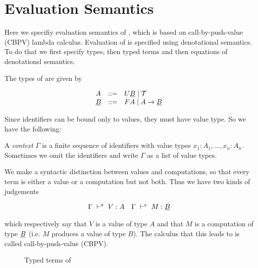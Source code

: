 \section{Evaluation Semantics}
\label{sec:evaluation}

Here we specifiy evaluation semantics of \corelang, which is based on
call-by-push-value (CBPV) lambda calculus. Evaluation of \corelang is
specified using denotational semantics. To do that we first specify types,
then typed terms and then equations of denotationsl semantics.

The types of \corelang are given by 

\begin{equation}
\begin{array}{l c l}
  A			& ::= & U\underline{B} \mid \mathcal{T}  \\
  \underline{B}	& ::= & FA \mid A \to \underline{B}
\end{array}
\end{equation}

Since identifiers can be bound only to values, they must have value type. So
we have the following:

\begin{definition}
 A \emph{context} $\Gamma$ is a finite sequence of identifiers with value
 types $x_1: A_1, \dots ,x_n: A_n$. Sometimes we omit the identifiers and
 write $\Gamma$ as a list of value types.
\end{definition}

We make a syntactic distinction between values and computations, so that
every term is either a value or a computation but not both. Thus we have two kinds of judgements

\begin{equation}
\begin{array}{c c}\DerEnvV{V : A} & \DerEnvC{M : \Un{B}} \end{array}
\end{equation}

\noindent which respectively say that $V$ is a value of type $A$ and that $M$
is a computation of type $\underline{B}$ (i.e. $M$ produces a value of type $B$). The
calculus that this leads to is called call-by-push-value (CBPV).

\begin{figure}[h]
    
    \caption{Typed terms of \corelang}
    \label{fig:core-terms}
\end{figure}

%     
    
